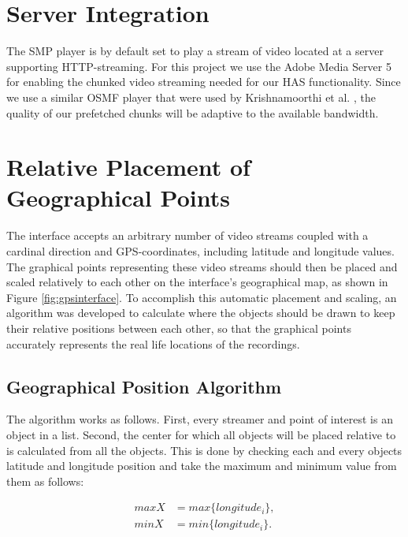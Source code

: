 \section{Server Integration}
\label{sec:serverintegration}

The SMP player is by default set to play a stream of video located at a server supporting HTTP-streaming. For this project we use the Adobe Media Server 5 for enabling the chunked video streaming needed for our HAS functionality. Since we use a similar OSMF player that were used by Krishnamoorthi et al. \cite{hasmultipath}, the quality of our prefetched chunks will be adaptive to the available bandwidth\cite{hasmultipath}.

\section{Relative Placement of Geographical Points}
\label{sec:relativeplacement}

The interface accepts an arbitrary number of video streams coupled with a cardinal direction and GPS-coordinates, including latitude and longitude values. The graphical points representing these video streams should then be placed and scaled relatively to each other on the interface's geographical map, as shown in Figure \ref{fig:gpsinterface}. To accomplish this automatic placement and scaling, an algorithm was developed to calculate where the objects should be drawn to keep their relative positions between each other, so that the graphical points accurately represents the real life locations of the recordings.

\subsection{Geographical Position Algorithm}
\label{sec:geoalgorithm}

The algorithm works as follows. First, every streamer and point of interest is an object in a list. Second, the center for which all objects will be placed relative to is calculated from all the objects. This is done by checking each and every objects latitude and longitude position and take the maximum and minimum value from them as follows:

\begin{align}
\label{eq:maxandmin}
maxX &= max\{longitude_i\},  \\
minX &= min\{longitude_i\}. \nonumber
\end{align}
 
